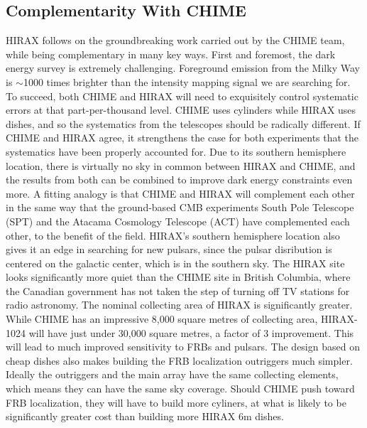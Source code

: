 \documentclass[letterpaper,11pt,preprint]{aastex}
\begin{document}
\subsection{Complementarity With CHIME} HIRAX follows on the groundbreaking
work carried out by the CHIME team, while being complementary in many
key ways.  First and foremost, the dark energy survey is extremely
challenging.  Foreground emission from the Milky Way is $\sim$1000
times brighter than the intensity mapping signal we are searching for.
To succeed, both CHIME and HIRAX will need to exquisitely control
systematic errors at that part-per-thousand level.  CHIME uses
cylinders while HIRAX uses dishes, and so the systematics from the
telescopes should be radically different.  If CHIME and HIRAX agree,
it strengthens the case for both experiments that the systematics have
been properly accounted for.  Due to its southern hemisphere location,
there is virtually no sky in common between HIRAX and CHIME, and the
results from both can be combined to improve dark energy constraints
even more.  A fitting analogy is that CHIME and HIRAX will complement
each other in the same way that the ground-based CMB experiments South
Pole Telescope (SPT) and the Atacama Cosmology Telescope (ACT) have
complemented each other, to the benefit of the field.  HIRAX's
southern hemisphere location also gives it an edge in searching for
new pulsars, since the pulsar disribution is centered on the galactic
center, which is in the southern sky.  The HIRAX site looks
significantly more quiet than the CHIME site in British Columbia,
where the Canadian government has not taken the step of turning off TV
stations for radio astronomy.  The nominal collecting area of HIRAX is
significantly greater.  While CHIME has an impressive 8,000 square
metres of collecting area, HIRAX-1024 will have just under 30,000
square metres, a factor of 3 improvement.  This will lead to much
improved sensitivity to FRBs and pulsars.  The design based on cheap
dishes also makes building the FRB localization outriggers much
simpler.  Ideally the outriggers and the main array have the same
collecting elements, which means they can have the same sky coverage.
Should CHIME push toward FRB localization, they will have to build
more cyliners, at what is likely to be significantly greater cost than
building more HIRAX 6m dishes.  
\end{document}
